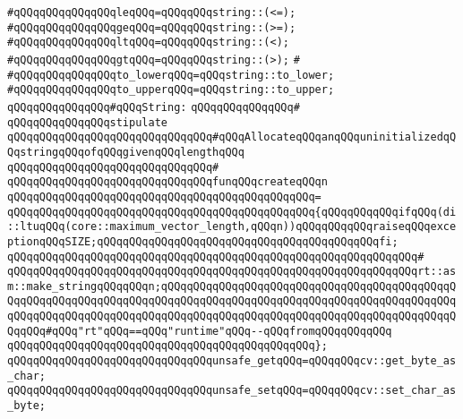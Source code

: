 \verb|#qQQqqQQqqQQqqQQqleqQQq=qQQqqQQqstring::(<=);|\newline
\verb|#qQQqqQQqqQQqqQQqgeqQQq=qQQqqQQqstring::(>=);|\newline
\verb|#qQQqqQQqqQQqqQQqltqQQq=qQQqqQQqstring::(<);|\newline
\verb|#qQQqqQQqqQQqqQQqgtqQQq=qQQqqQQqstring::(>);|\newline
\verb|#|\newline
\verb|#qQQqqQQqqQQqqQQqto_lowerqQQq=qQQqstring::to_lower;|\newline
\verb|#qQQqqQQqqQQqqQQqto_upperqQQq=qQQqstring::to_upper;|\newline
\newline
\verb|qQQqqQQqqQQqqQQq#qQQqString:|\newline
\verb|qQQqqQQqqQQqqQQq#|\newline
\verb|qQQqqQQqqQQqqQQqstipulate|\newline
\verb|qQQqqQQqqQQqqQQqqQQqqQQqqQQqqQQq#qQQqAllocateqQQqanqQQquninitializedqQQqstringqQQqofqQQqgivenqQQqlengthqQQq|\newline
\verb|qQQqqQQqqQQqqQQqqQQqqQQqqQQqqQQq#|\newline
\verb|qQQqqQQqqQQqqQQqqQQqqQQqqQQqqQQqfunqQQqcreateqQQqn|\newline
\verb|qQQqqQQqqQQqqQQqqQQqqQQqqQQqqQQqqQQqqQQqqQQqqQQq=|\newline
\verb|qQQqqQQqqQQqqQQqqQQqqQQqqQQqqQQqqQQqqQQqqQQqqQQq{qQQqqQQqqQQqifqQQq(di::ltuqQQq(core::maximum_vector_length,qQQqn))qQQqqQQqqQQqraiseqQQqexceptionqQQqSIZE;qQQqqQQqqQQqqQQqqQQqqQQqqQQqqQQqqQQqqQQqqQQqfi;|\newline
\verb|qQQqqQQqqQQqqQQqqQQqqQQqqQQqqQQqqQQqqQQqqQQqqQQqqQQqqQQqqQQqqQQq#|\newline
\verb|qQQqqQQqqQQqqQQqqQQqqQQqqQQqqQQqqQQqqQQqqQQqqQQqqQQqqQQqqQQqqQQqrt::asm::make_stringqQQqqQQqn;qQQqqQQqqQQqqQQqqQQqqQQqqQQqqQQqqQQqqQQqqQQqqQQqqQQqqQQqqQQqqQQqqQQqqQQqqQQqqQQqqQQqqQQqqQQqqQQqqQQqqQQqqQQqqQQqqQQqqQQqqQQqqQQqqQQqqQQqqQQqqQQqqQQqqQQqqQQqqQQqqQQqqQQqqQQqqQQqqQQqqQQqqQQqqQQq#qQQq"rt"qQQq==qQQq"runtime"qQQq--qQQqfromqQQqqQQqqQQq|\newline
\verb|qQQqqQQqqQQqqQQqqQQqqQQqqQQqqQQqqQQqqQQqqQQqqQQq};|\newline
\newline
\verb|qQQqqQQqqQQqqQQqqQQqqQQqqQQqqQQqunsafe_getqQQq=qQQqqQQqcv::get_byte_as_char;|\newline
\verb|qQQqqQQqqQQqqQQqqQQqqQQqqQQqqQQqunsafe_setqQQq=qQQqqQQqcv::set_char_as_byte;|\newline
